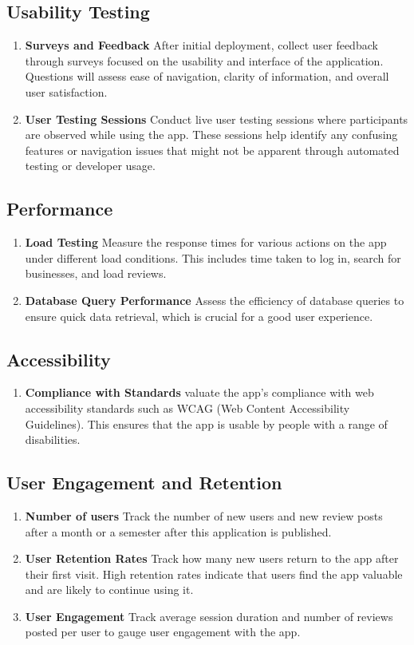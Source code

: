 \documentclass[10pt,twocolumn]{article}
\begin{document}
        \subsection{Usability Testing}
        \begin{enumerate}
        \item \textbf{Surveys and Feedback} After initial deployment, collect user feedback through surveys focused on the usability and interface of the application. Questions will assess ease of navigation, clarity of information, and overall user satisfaction.
        \item \textbf{User Testing Sessions} Conduct live user testing sessions where participants are observed while using the app. These sessions help identify any confusing features or navigation issues that might not be apparent through automated testing or developer usage.
    \end{enumerate}
            \subsection{Performance}
        \begin{enumerate}
        \item \textbf{Load Testing} Measure the response times for various actions on the app under different load conditions. This includes time taken to log in, search for businesses, and load reviews.
        \item \textbf{Database Query Performance} Assess the efficiency of database queries to ensure quick data retrieval, which is crucial for a good user experience.
    \end{enumerate}
            \subsection{Accessibility}
        \begin{enumerate}
        \item \textbf{Compliance with Standards} valuate the app's compliance with web accessibility standards such as WCAG (Web Content Accessibility Guidelines). This ensures that the app is usable by people with a range of disabilities.
    \end{enumerate}
        \subsection{User Engagement and Retention}
        \begin{enumerate}
        \item \textbf{Number of users} Track the number of new users and new review posts after a month or a semester after this application is published.
        \item \textbf{User Retention Rates} Track how many new users return to the app after their first visit. High retention rates indicate that users find the app valuable and are likely to continue using it.
        \item \textbf{User Engagement} Track average session duration and number of reviews posted per user to gauge user engagement with the app.
    \end{enumerate}
\end{document}
